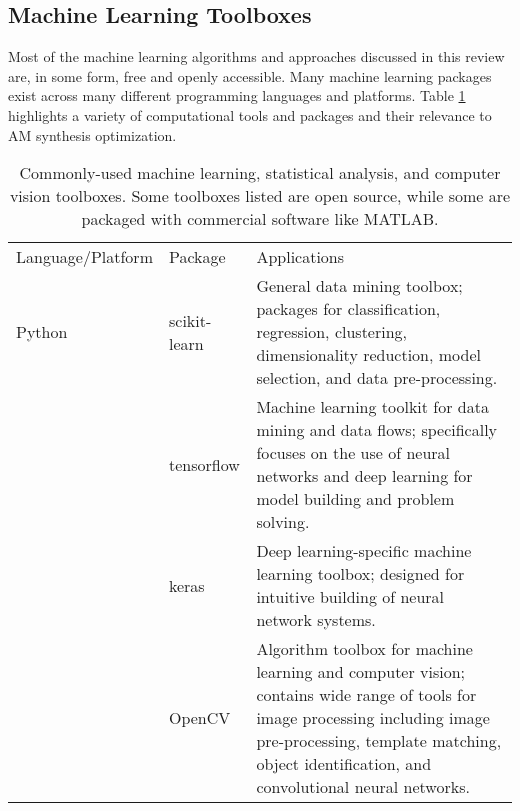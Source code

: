 \subsection{Machine Learning Toolboxes}
Most of the machine learning algorithms and approaches discussed in this review are, in some form, free and openly accessible. Many machine learning packages exist across many different programming languages and platforms. Table \ref{data_tools} highlights a variety of computational tools and packages and their relevance to AM synthesis optimization. 

\begin{landscape}
           \renewcommand{\arraystretch}{0.8}
    \setlength{\tabcolsep}{5pt}
    \begin{center}

        \begin{longtable}{p{4cm}p{4cm}p{11cm}} 
                \endfirsthead
                \caption{Commonly-used machine learning, statistical analysis, and computer vision toolboxes. Some toolboxes listed are open source, while some are packaged with commercial software like MATLAB. \label{data_tools}} \\ \hline
           
            Language/Platform & Package & Applications  \\ 


            \hline
            Python & scikit-learn \cite{sklearn} & General data mining toolbox; packages for classification, regression, clustering, dimensionality reduction, model selection, and data pre-processing. \newline \\
            		& tensorflow \cite{tensorflow} & Machine learning toolkit for data mining and data flows; specifically focuses on the use of neural networks and deep learning for model building and problem solving. \newline \\
			& keras \cite{keras} & Deep learning-specific machine learning toolbox; designed for intuitive building of neural network systems. \newline \\
			& OpenCV \cite{opencv} & Algorithm toolbox for machine learning and computer vision; contains wide range of tools for image processing including image pre-processing, template matching, object identification, and convolutional neural networks. \newline \\
			

\end{longtable}
\end{center}
\end{landscape}
